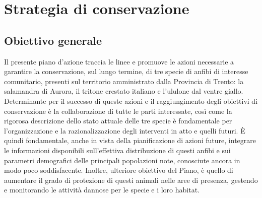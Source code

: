 \documentclass[10pt,twoside,openany,x11names,svgnames,italian,a5paper,dvipsnames,table]{memoir}
\newcommand\chapterillustration{}
\begin{document}
\chapter{Strategia di conservazione}
\renewcommand\chapterillustration{6.jpg}

\section{Obiettivo generale}
Il presente piano d’azione traccia le linee e promuove le azioni necessarie a garantire la conservazione, sul lungo termine, di tre specie di anfibi di interesse comunitario, presenti sul territorio amministrato dalla Provincia di Trento: la salamandra di Aurora, il tritone crestato italiano e l’ululone dal ventre giallo. Determinante per il successo di queste azioni e il raggiungimento degli obiettivi di conservazione è la collaborazione di tutte le parti interessate, così come la rigorosa descrizione dello stato attuale delle tre specie è fondamentale per l’organizzazione e la razionalizzazione degli interventi in atto e quelli futuri. È quindi fondamentale, anche in vista della pianificazione di azioni future, integrare le informazioni disponibili sull’effettiva distribuzione di questi anfibi e sui parametri demografici delle principali popolazioni note, conosciute ancora in modo poco soddisfacente. Inoltre, ulteriore obiettivo del Piano, è quello di aumentare il grado di protezione di questi animali nelle aree di presenza, gestendo e monitorando le attività dannose per le specie e i loro habitat.
\end{document}
